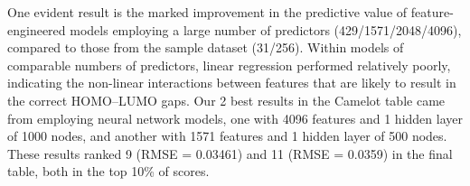 \documentclass[11pt]{article}
\begin{document}
One evident result is the marked improvement in the predictive value of feature-engineered models employing a large number of predictors (429/1571/2048/4096), compared to those from the sample dataset (31/256). Within models of comparable numbers of predictors, linear regression performed relatively poorly, indicating the non-linear interactions between features that are likely to result in the correct HOMO--LUMO gaps. Our 2 best results in the Camelot table came from employing neural network models, one with 4096 features and 1 hidden layer of 1000 nodes, and another with 1571 features and 1 hidden layer of 500 nodes. These results ranked 9 (RMSE = 0.03461) and 11 (RMSE = 0.0359) in the final table, both in the top 10\% of scores.







\end{document}

